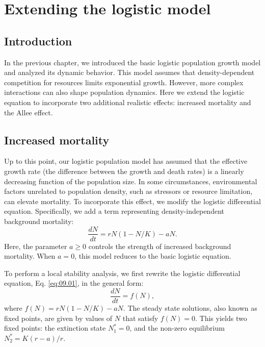 \chapter{Extending the logistic model}
\label{ch:09} 


\section{Introduction}

In the previous chapter, we introduced the basic logistic population growth model and analyzed its dynamic behavior. This model assumes that density-dependent competition for resources limits exponential growth. However, more complex interactions can also shape population dynamics. Here we extend the logistic equation to incorporate two additional realistic effects: increased mortality and the Allee effect.

\section{Increased mortality}

Up to this point, our logistic population model has assumed that the effective growth rate (the difference between the growth and death rates) is a linearly decreasing function of the population size. In some circumstances, environmental factors unrelated to population density, such as stressors or resource limitation, can elevate mortality. To incorporate this effect, we modify the logistic differential equation. Specifically, we add a term representing density-independent background mortality:
\begin{equation}
\frac{dN}{dt} = rN(1-N/K) - aN.
\label{eq:09.01}
\end{equation}
Here, the parameter $a \geq 0$ controls the strength of increased background mortality. When $a=0$, this model reduces to the basic logistic equation.

To perform a local stability analysis, we first rewrite the logistic differential equation, Eq. \eqref{eq:09.01}, in the general form:
\begin{equation*}
\frac{dN}{dt} = f(N),
\end{equation*}
where $f(N)=rN(1-N/K)-aN$. The steady state solutions, also known as fixed points, are given by values of $N$ that satisfy $f(N)=0$. This yields two fixed points: the extinction state $N^*_1=0$, and the non-zero equilibrium $N^*_2=K(r-a)/r$.

